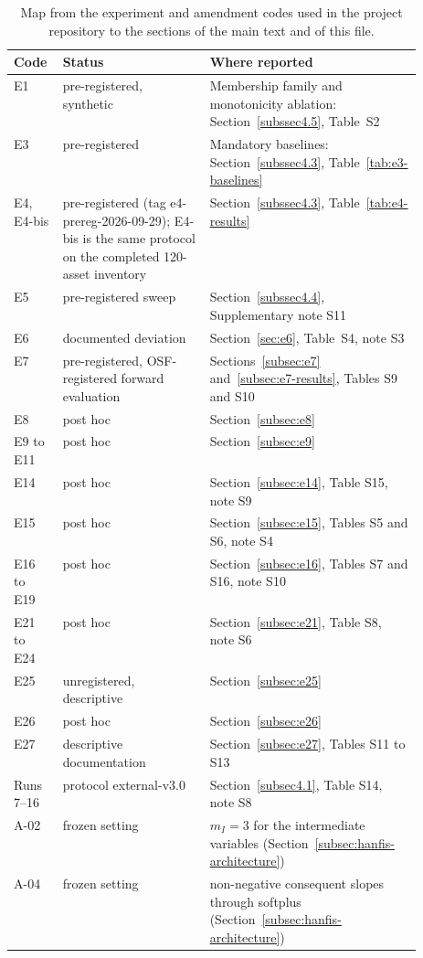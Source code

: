 \documentclass[pdflatex,sn-basic]{sn-jnl}
\theoremstyle{thmstyleone}%
\theoremstyle{thmstyletwo}%
\theoremstyle{thmstylethree}%
\begin{document}
\begin{table}[ht]
\caption{Map from the experiment and amendment codes used in the project repository to the sections of the main text and of this file.}\label{tab:code-map}
\small
\begin{tabular}{@{}llp{0.52\linewidth}@{}}
\toprule
Code & Status & Where reported \\
\midrule
E1 & pre-registered, synthetic & Membership family and monotonicity ablation: Section~\ref{subssec4.5}, Table~S2 \\
E3 & pre-registered & Mandatory baselines: Section~\ref{subssec4.3}, Table~\ref{tab:e3-baselines} \\
E4, E4-bis & pre-registered (tag e4-prereg-2026-09-29); E4-bis is the same protocol on the completed 120-asset inventory & Section~\ref{subssec4.3}, Table~\ref{tab:e4-results} \\
E5 & pre-registered sweep & Section~\ref{subssec4.4}, Supplementary note S11 \\
E6 & documented deviation & Section~\ref{sec:e6}, Table~S4, note S3 \\
E7 & pre-registered, OSF-registered forward evaluation & Sections~\ref{subsec:e7} and~\ref{subsec:e7-results}, Tables S9 and S10 \\
E8 & post hoc & Section~\ref{subsec:e8} \\
E9 to E11 & post hoc & Section~\ref{subsec:e9} \\
E14 & post hoc & Section~\ref{subsec:e14}, Table S15, note S9 \\
E15 & post hoc & Section~\ref{subsec:e15}, Tables S5 and S6, note S4 \\
E16 to E19 & post hoc & Section~\ref{subsec:e16}, Tables S7 and S16, note S10 \\
E21 to E24 & post hoc & Section~\ref{subsec:e21}, Table S8, note S6 \\
E25 & unregistered, descriptive & Section~\ref{subsec:e25} \\
E26 & post hoc & Section~\ref{subsec:e26} \\
E27 & descriptive documentation & Section~\ref{subsec:e27}, Tables S11 to S13 \\
Runs 7--16 & protocol external-v3.0 & Section~\ref{subsec4.1}, Table S14, note S8 \\
A-02 & frozen setting & $m_I=3$ for the intermediate variables (Section~\ref{subsec:hanfis-architecture}) \\
A-04 & frozen setting & non-negative consequent slopes through softplus (Section~\ref{subsec:hanfis-architecture}) \\

\end{tabular}
\end{table}
\end{document}
